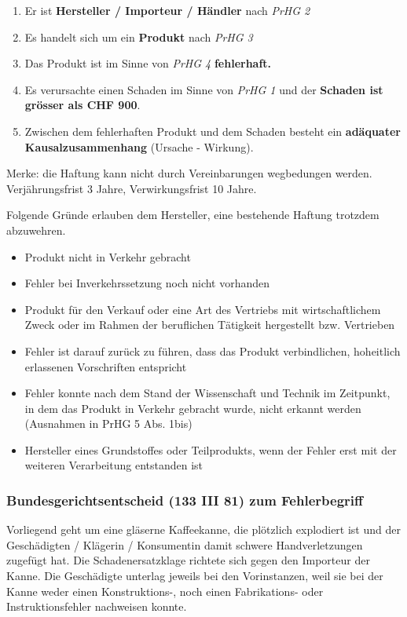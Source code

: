 \begin{enumerate}
  \item Er ist \textbf{Hersteller / Importeur / Händler} nach \textit{PrHG 2}
  \item Es handelt sich um ein \textbf{Produkt} nach \textit{PrHG 3}
  \item Das Produkt ist im Sinne von \textit{PrHG 4} \textbf{fehlerhaft.}
  \item Es verursachte einen Schaden im Sinne von \textit{PrHG 1} und der \textbf{Schaden ist grösser als CHF 900}.
  \item Zwischen dem fehlerhaften Produkt und dem Schaden besteht ein \textbf{adäquater Kausalzusammenhang} (Ursache - Wirkung).
\end{enumerate}

Merke: die Haftung kann nicht durch Vereinbarungen wegbedungen werden. Verjährungsfrist 3 Jahre, Verwirkungsfrist 10 Jahre.
\vspace{3mm}

Folgende Gründe erlauben dem Hersteller, eine bestehende Haftung trotzdem abzuwehren.

\begin{itemize}
  \item Produkt nicht in Verkehr gebracht
  \item Fehler bei Inverkehrssetzung noch nicht vorhanden
  \item Produkt für den Verkauf oder eine Art des Vertriebs mit wirtschaftlichem Zweck oder im Rahmen der beruflichen Tätigkeit hergestellt bzw. Vertrieben
  \item Fehler ist darauf zurück zu führen, dass das Produkt verbindlichen, hoheitlich erlassenen Vorschriften entspricht
  \item Fehler konnte nach dem Stand der Wissenschaft und Technik im Zeitpunkt, in dem das Produkt in Verkehr gebracht wurde, nicht erkannt werden (Ausnahmen in PrHG 5 Abs. 1bis)
  \item Hersteller eines Grundstoffes oder Teilprodukts, wenn der Fehler erst mit der weiteren Verarbeitung entstanden ist
\end{itemize}

\subsubsection*{Bundesgerichtsentscheid (133 III 81) zum Fehlerbegriff}
Vorliegend geht um eine gläserne Kaffeekanne, die plötzlich explodiert ist und der Geschädigten / Klägerin / Konsumentin damit schwere Handverletzungen zugefügt hat. Die Schadenersatzklage richtete sich gegen den Importeur der Kanne. Die Geschädigte unterlag jeweils bei den Vorinstanzen, weil sie bei der Kanne weder einen Konstruktions-, noch einen Fabrikations- oder Instruktionsfehler nachweisen konnte.


